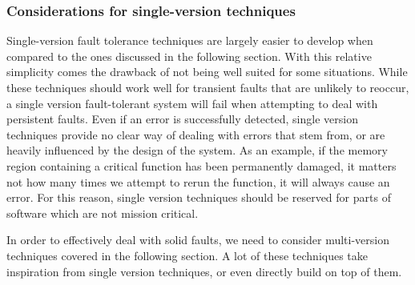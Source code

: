 \subsubsection{Considerations for single-version techniques}

Single-version fault tolerance techniques are largely easier to develop when compared to the ones discussed in the following section. With this relative simplicity comes the drawback of not being well suited for some situations. While these techniques should work well for transient faults that are unlikely to reoccur, a single version fault-tolerant system will fail when attempting to deal with persistent faults. Even if an error is successfully detected, single version techniques provide no clear way of dealing with errors that stem from, or are heavily influenced by the design of the system. As an example, if the memory region containing a critical function has been permanently damaged, it matters not how many times we attempt to rerun the function, it will always cause an error. For this reason, single version techniques should be reserved for parts of software which are not mission critical.

In order to effectively deal with solid faults, we need to consider multi-version techniques covered in the following section. A lot of these techniques take inspiration from single version techniques, or even directly build on top of them.